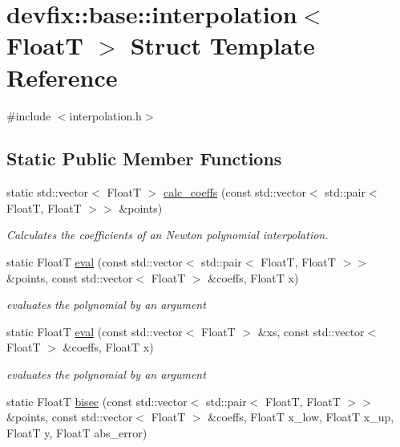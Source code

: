 \hypertarget{structdevfix_1_1base_1_1interpolation}{}\section{devfix\+:\+:base\+:\+:interpolation$<$ FloatT $>$ Struct Template Reference}
\label{structdevfix_1_1base_1_1interpolation}


{\ttfamily \#include $<$interpolation.\+h$>$}

\subsection*{Static Public Member Functions}
\begin{DoxyCompactItemize}
\item 
static std\+::vector$<$ FloatT $>$ \hyperlink{structdevfix_1_1base_1_1interpolation_a785dcc23e3504edbd7240492a4b1b028}{calc\+\_\+coeffs} (const std\+::vector$<$ std\+::pair$<$ FloatT, FloatT $>$$>$ \&points)
\begin{DoxyCompactList}\small\item\em Calculates the coefficients of an Newton polynomial interpolation. \end{DoxyCompactList}\item 
static FloatT \hyperlink{structdevfix_1_1base_1_1interpolation_ab769ce14a1e3bb758fa7b8b8db812101}{eval} (const std\+::vector$<$ std\+::pair$<$ FloatT, FloatT $>$$>$ \&points, const std\+::vector$<$ FloatT $>$ \&coeffs, FloatT x)
\begin{DoxyCompactList}\small\item\em evaluates the polynomial by an argument \end{DoxyCompactList}\item 
static FloatT \hyperlink{structdevfix_1_1base_1_1interpolation_a327edb7c780e1020721e3f45b4760f44}{eval} (const std\+::vector$<$ FloatT $>$ \&xs, const std\+::vector$<$ FloatT $>$ \&coeffs, FloatT x)
\begin{DoxyCompactList}\small\item\em evaluates the polynomial by an argument \end{DoxyCompactList}\item 
static FloatT \hyperlink{structdevfix_1_1base_1_1interpolation_abd881b1363ade2c258fc8b7acf093648}{bisec} (const std\+::vector$<$ std\+::pair$<$ FloatT, FloatT $>$$>$ \&points, const std\+::vector$<$ FloatT $>$ \&coeffs, FloatT x\+\_\+low, FloatT x\+\_\+up, FloatT y, FloatT abs\+\_\+error)
$$
\end{DoxyCompactItemize}
